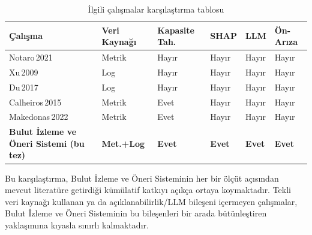 \begin{table}[htbp]
    \centering
    \caption{İlgili çalışmalar karşılaştırma tablosu}
    \label{tab:ilgili-karsılastırma}
    \begin{tabular}{p{3.2cm}p{2.0cm}p{1.5cm}p{1.5cm}p{1.5cm}p{1.8cm}}
        \textbf{Çalışma} & \textbf{Veri Kaynağı} & \textbf{Kapasite Tah.} & \textbf{SHAP} & \textbf{LLM} & \textbf{Ön-Arıza} \\
        \hline
        Notaro\,2021 \autocite{notaro2021}      & Metrik    & Hayır & Hayır & Hayır & Hayır \\
        Xu\,2009 \autocite{xu2009}              & Log       & Hayır & Hayır & Hayır & Hayır \\
        Du\,2017 \autocite{du2017}              & Log       & Hayır & Hayır & Hayır & Hayır \\
        Calheiros\,2015 \autocite{calheiros2015}& Metrik    & Evet  & Hayır & Hayır & Hayır \\
        Makedonas\,2022 \autocite{makedonas2022}& Metrik    & Evet  & Hayır & Hayır & Hayır \\
        \textbf{Bulut İzleme ve Öneri Sistemi (bu tez)}              & \textbf{Met.+Log} & \textbf{Evet} & \textbf{Evet} & \textbf{Evet} & \textbf{Evet} \\
    \end{tabular}
\end{table}

Bu karşılaştırma, Bulut İzleme ve Öneri Sisteminin her bir ölçüt açısından mevcut literatüre getirdiği kümülatif katkıyı açıkça ortaya koymaktadır.
Tekli veri kaynağı kullanan ya da açıklanabilirlik/LLM bileşeni içermeyen çalışmalar, Bulut İzleme ve Öneri Sisteminin bu bileşenleri bir arada bütünleştiren yaklaşımına kıyasla sınırlı kalmaktadır.
